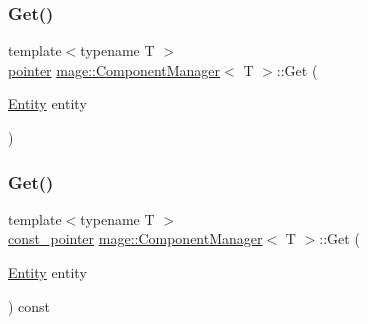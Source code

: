 \mbox{\label{classmage_1_1_component_manager_aef43a141be2f7ebd0123e4d34b66581b}} 
\subsubsection{\texorpdfstring{Get()}{Get()}\hspace{0.1cm}{\footnotesize\ttfamily [1/2]}}
{\footnotesize\ttfamily template$<$typename T $>$ \\
\mbox{\hyperlink{classmage_1_1_component_manager_a8a96debf4c395e068990c85e8b66d564}{pointer}} \mbox{\hyperlink{classmage_1_1_component_manager}{mage\+::\+Component\+Manager}}$<$ T $>$\+::Get (\begin{DoxyParamCaption}\item[{\mbox{\hyperlink{classmage_1_1_entity}{Entity}}}]{entity }\end{DoxyParamCaption})\hspace{0.3cm}{\ttfamily [noexcept]}}

\mbox{\label{classmage_1_1_component_manager_aaf81852975938880f52b60e5d03b9a85}} 
\subsubsection{\texorpdfstring{Get()}{Get()}\hspace{0.1cm}{\footnotesize\ttfamily [2/2]}}
{\footnotesize\ttfamily template$<$typename T $>$ \\
\mbox{\hyperlink{classmage_1_1_component_manager_aca0462fe048337b5453e72cb7facaf31}{const\+\_\+pointer}} \mbox{\hyperlink{classmage_1_1_component_manager}{mage\+::\+Component\+Manager}}$<$ T $>$\+::Get (\begin{DoxyParamCaption}\item[{\mbox{\hyperlink{classmage_1_1_entity}{Entity}}}]{entity }\end{DoxyParamCaption}) const\hspace{0.3cm}{\ttfamily [noexcept]}}

\mbox{\label{classmage_1_1_component_manager_a43d6a22901bc502d908e738c550b1fbe}} 
